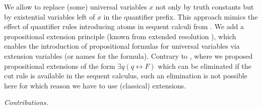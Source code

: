 \documentclass{llncs}
\newcommand{\lequiv}{\leftrightarrow}
\begin{document}
We allow to replace (some) universal variables $x$ not only by truth
constants but by existential variables left of $x$ in the quantifier
prefix. This approach mimics the effect of quantifier rules
introducing atoms in sequent calculi from \cite{DBLP:conf/sat/Egly12}.
We add a propositional extension principle (known from extended
resolution \cite{Tseitin:1968}), which enables the introduction of
propositional formulas for universal variables via extension variables
(or names for the formula).  Contrary to \cite{DBLP:conf/sat/Egly12},
where we proposed propositional extensions of the form $\exists q
(q\lequiv F)$ which can be eliminated if the cut rule is available in
the sequent calculus, such an elimination is not possible here for
which reason we have to use (classical) extensions.

\smallskip
\noindent
\emph{Contributions.}
\vspace*{-0.5em}
\end{document}
